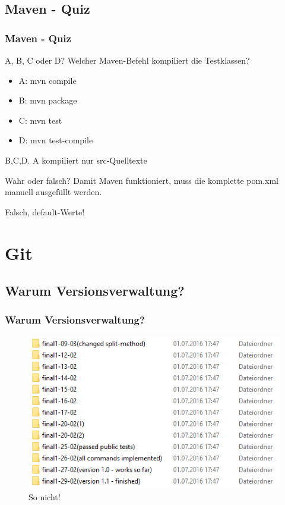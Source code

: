 \documentclass[18pt]{beamer}
\begin{document}
	\subsection{Maven - Quiz}
	\begin{frame}
		\frametitle{Maven - Quiz}
		\begin{block}{A, B, C oder D?}
			Welcher Maven-Befehl kompiliert die Testklassen?
			\begin{itemize}
				\item A: mvn compile
				\item B: mvn package
				\item C: mvn test
				\item D: mvn test-compile
			\end{itemize}
		\end{block}
		\pause
		B,C,D. A kompiliert nur src-Quelltexte
		\begin{block}{Wahr oder falsch?}
			Damit Maven funktioniert, muss die komplette pom.xml manuell ausgefüllt werden. 
		\end{block}
		\pause
		Falsch, default-Werte!
	\end{frame}


\section{Git}
	\subsection{Warum Versionsverwaltung?}
	\begin{frame}
		\frametitle{Warum Versionsverwaltung?}
		\begin{figure}
			\includegraphics[scale=0.7]{./pics/tut0/bad-version-management.png}
			\linebreak
			\centering 			So nicht!
		\end{figure}	
	\end{frame}
	
\end{document}
